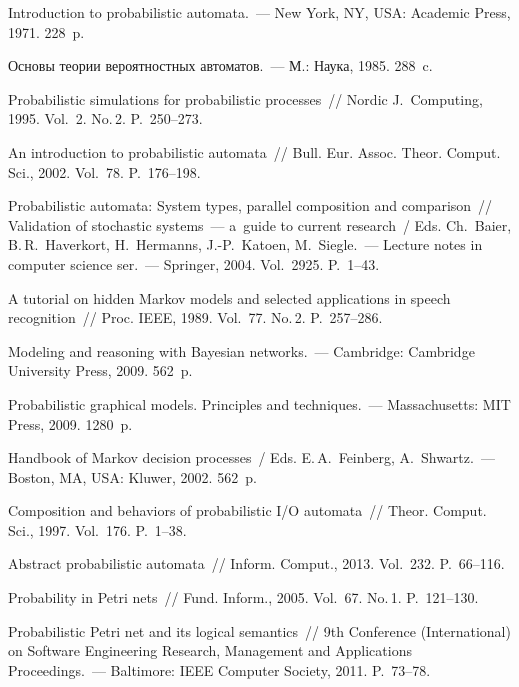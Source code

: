 \begin{multicols}{2}
{{\begin{thebibliography}{99}
Introduction to probabilistic automata.~--- New York, NY, USA: Academic Press, 1971.
228~p.

Основы теории вероятностных автоматов.~--- М.: Наука, 1985.
288~c.

Probabilistic simulations for probabilistic processes~// Nordic J.~Computing, 1995.
Vol.~2. No.\,2. P.~250--273.

An introduction to probabilistic automata~//
Bull.  Eur. Assoc. Theor. Comput. Sci.,
2002. Vol.~78. P.~176--198.

Probabilistic automata: System types, parallel
composition and comparison~// Validation of stochastic systems~--- 
a~guide to current research~/  Eds. Ch.~Baier, B.\,R.~Haverkort, 
H.~Hermanns, J.-P.~Katoen,  M.~Siegle.~---
Lecture notes in computer science ser.~--- Springer, 2004.
Vol.~2925. P.~1--43.

A tutorial on hidden Markov models and selected applications in speech recognition~//
Proc. IEEE, 1989. Vol.~77. No.\,2. P.~257--286.

Modeling and reasoning with Bayesian networks.~--- Cambridge: Cambridge University Press, 2009.
562~p.

Probabilistic graphical models.
Principles and techniques.~--- Massachusetts: MIT Press, 2009.
1280~p.

Handbook of Markov decision processes~/
Eds. E.\,A.~Feinberg, A.~Shwartz.~--- Boston, MA, USA: Kluwer, 2002.
562~p.

Composition and behaviors of probabilistic I/O automata~//
Theor. Comput. Sci., 1997.  Vol.~176. P.~1--38.

 Abstract probabilistic  automata~//
Inform. Comput., 2013. Vol.~232. P.~66--116.
{

}

Probability in Petri nets~// Fund. Inform., 2005. Vol.~67. No.\,1.
P.~121--130.

Probabilistic Petri net and its logical semantics~//
9th  Conference (International) on Software Engineering Research, Management
and Applications Proceedings.~--- Baltimore: IEEE Computer Society, 2011.
P.~73--78.


\end{thebibliography}}}
\end{multicols}
